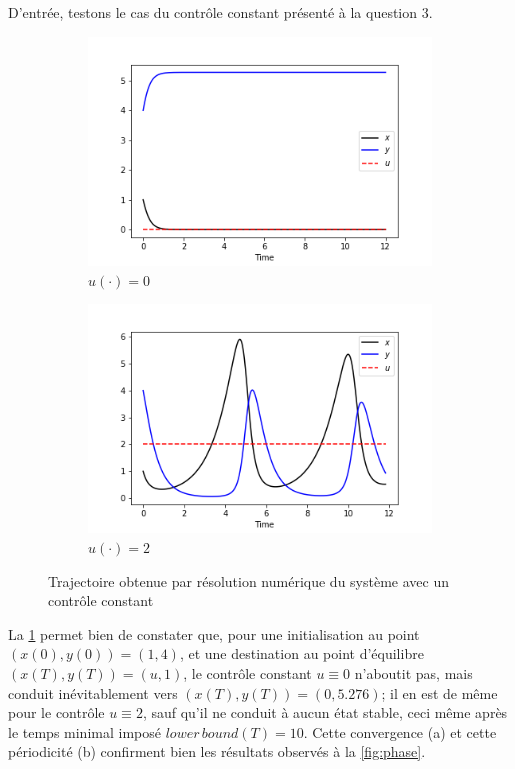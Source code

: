 \documentclass[
	french,
	11pt, %
]{fphw}
\begin{document}
D'entrée, testons le cas du contrôle constant présenté à la question 3.
\begin{figure}[H]
    \centering
    \begin{subfigure}[b]{0.4\textwidth}
        \includegraphics[width=\textwidth]{Exo3Test1.png}
        \caption{$u(\cdot)=0$}
    \end{subfigure}
    \begin{subfigure}[b]{0.4\textwidth}
        \includegraphics[width=\textwidth]{Exo3Test2.png}
        \caption{$u(\cdot)=2$}
    \end{subfigure}
       \caption{Trajectoire obtenue par résolution numérique du système avec un contrôle constant}
       \label{fig:Exo3Test}
\end{figure}

La \cref{fig:Exo3Test} permet bien de constater que, pour une initialisation au point $(x(0),y(0)) = (1,4)$, et une destination au point d'équilibre $(x(T),y(T)) = (u,1)$, le contrôle constant $u\equiv0$ n'aboutit pas, mais conduit inévitablement vers $(x(T),y(T)) = (0,5.276)$; il en est de même pour le contrôle $u\equiv2$, sauf qu'il ne conduit à aucun état stable, ceci même après le temps minimal imposé $lower \, bound (T) = 10$. Cette convergence (a) et cette périodicité (b) confirment bien les résultats observés à la \cref{fig:phase}.
 
\end{document}
